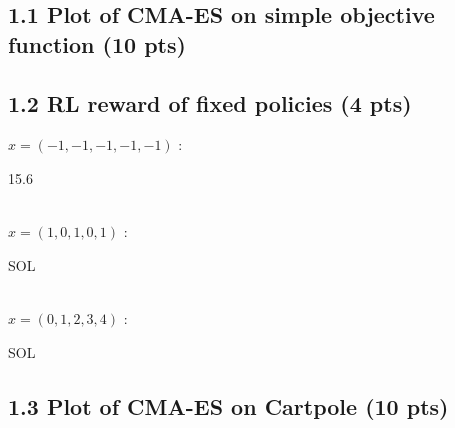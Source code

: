 \documentclass[12pt]{article}
\begin{document}
\subsection*{1.1 Plot of CMA-ES on simple objective function (10 pts)}
\begin{tcolorbox}[fit,height=30em, width=40em, blank, borderline={1pt}{1pt},nobeforeafter]
            \begin{center}
            \begin{solution}

            \end{solution}
            \end{center}
            \end{tcolorbox}
            
\subsection*{1.2 RL reward of fixed policies (4 pts)}

$x = (-1, -1, -1, -1, -1)$ : \begin{tcolorbox}[fit,height=1cm, width=5cm, blank, borderline={1pt}{1pt},nobeforeafter]
    \begin{center}
    \vspace{3mm}
    \large{15.6}
    \end{center}
\end{tcolorbox} \\
$x = (1, 0, 1, 0, 1)$ : \hspace{3.5em} \begin{tcolorbox}[fit,height=1cm, width=5cm, blank, borderline={1pt}{1pt},nobeforeafter]
    \begin{center}
    \vspace{3mm}
    \large{SOL}
    \end{center}
\end{tcolorbox} \\
$x = (0, 1, 2, 3, 4)$ : \hspace{3.5em} \begin{tcolorbox}[fit,height=1cm, width=5cm, blank, borderline={1pt}{1pt},nobeforeafter]
    \begin{center}
    \vspace{3mm}
    \large{SOL}
    \end{center}
\end{tcolorbox}

\subsection*{1.3 Plot of CMA-ES on Cartpole (10 pts)}
\begin{tcolorbox}[fit,height=30em, width=40em, blank, borderline={1pt}{1pt},nobeforeafter]
    \begin{center}
    \begin{solution}

    \end{solution}
    \end{center}
    \end{tcolorbox}
    
\end{document}
